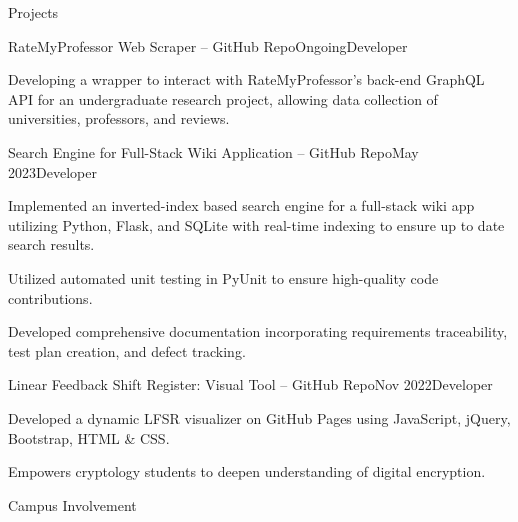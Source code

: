 \documentclass[11pt]{resume}
\begin{document}
\begin{rSection}{Projects}

    \begin{rSubsection}{RateMyProfessor Web Scraper – GitHub Repo}{Ongoing}{Developer}{}
        \item Developing a wrapper to interact with RateMyProfessor’s back-end GraphQL API for an undergraduate research project, allowing data collection of universities, professors, and reviews.
    \end{rSubsection}
	
    \begin{rSubsection}{Search Engine for Full-Stack Wiki Application – GitHub Repo}{May 2023}{Developer}{}
        \item Implemented an inverted-index based search engine for a full-stack wiki app utilizing Python, Flask, and SQLite with real-time indexing to ensure up to date search results.
        \item Utilized automated unit testing in PyUnit to ensure high-quality code contributions.
        \item Developed comprehensive documentation incorporating requirements traceability, test plan creation, and defect tracking.
    \end{rSubsection}
	
    \begin{rSubsection}{Linear Feedback Shift Register: Visual Tool – GitHub Repo}{Nov 2022}{Developer}{}
        \item Developed a dynamic LFSR visualizer on GitHub Pages using JavaScript, jQuery, Bootstrap, HTML \& CSS.
        \item Empowers cryptology students to deepen understanding of digital encryption.
    \end{rSubsection}
	
\end{rSection}

\begin{rSection}{Campus Involvement}

\end{rSection}
\end{document}
